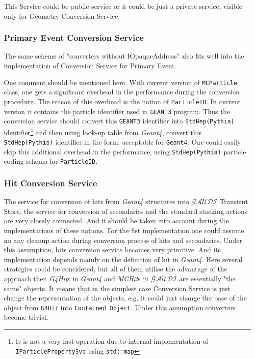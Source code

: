 \documentclass[nfss,times,12pt,a4paper]{article}
\begin{document}
This Service could be public  service or it could be 
just a private service, visible only for Geometry Conversion Service.
 
  \subsubsection{ Primary Event Conversion Service }

The same scheme of "converters without IOpaqueAddress" also fits well 
into the implementation of Conversion Service for Primary Event.

One comment should be mentioned here. With current version of 
{\tt MCParticle} class, one gets a significant overhead in the 
performance during the conversion procedure. The reason of this overhead
is the notion of {\tt ParticleID}. In current version it contains 
the particle identifier used in {\tt GEANT3} program.
Thus the conversion service should convert this {\tt GEANT3}  
identifier  into {\tt StdHep(Pythia)} identifier\footnote{It is not a very fast operation due 
to internal implementation of {\tt IParticlePropertySvc} using {\tt std::map}} 
and then using look-up table from {\it Geant4}, convert this {\tt StdHep(Pythia)}
identifier in the form, acceptable for {\tt Geant4}.
One could easily skip this additional overhead in the performance, using 
{\tt StdHep(Pythia)} particle coding schema for {\tt ParticleID}.
 

  \subsubsection{ Hit Conversion Service } 

The service for conversion of hits from {\it Geant4} 
structures into ${\mathcal{GAUDI}}$ Transient Store, 
the service for conversion of secondaries and the 
standard stacking actions are very closely connected.  
And it should be taken into account during the 
implementations of these notions. 
For the fist implementation one could assume no any cleanup 
action during conversion process of hits and secondaries. 
Under this assumption, hits conversion service 
becomes very primitive. And its implementation 
depends mainly on the definition of hit in {\it Geant4}. 
Here several strategies could be considered, but all of them
utilise the advantage of the approach then  
 {\it G4Hit}s in {\it Geant4} and {\it MCHit}s in ${\mathcal{GAUDI}}$ 
are essentially "the same" objects.  It means that
in the simplest case Conversion Service 
is just change the representation of the objects, e.g. 
it could just change the base of the object from 
{\tt G4Hit} into {\tt Contained Object}.       
Under this assumption converters become trivial. 
 
\end{document}
